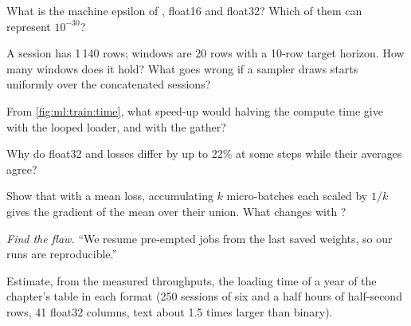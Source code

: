 \begin{exercise}[$\star$]\label{exo:ml:training-infrastructure:1}
What is the machine epsilon of , float16 and float32? Which of them can represent $10^{-30}$?
\end{exercise}

\begin{exercise}[$\star$]\label{exo:ml:training-infrastructure:2}
A session has 1\,140 rows; windows are 20 rows with a 10-row target horizon. How many windows does it hold? What goes wrong if a
sampler draws starts uniformly over the concatenated sessions?
\end{exercise}

\begin{exercise}[$\star$]\label{exo:ml:training-infrastructure:3}
From \cref{fig:ml:train:time}, what speed-up would halving the compute time give with the looped loader, and with the gather?
\end{exercise}

\begin{exercise}[$\star\star$]\label{exo:ml:training-infrastructure:4}
Why do float32 and  losses differ by up to 22\% at some steps while their averages agree?
\end{exercise}

\begin{exercise}[$\star\star$]\label{exo:ml:training-infrastructure:5}
Show that with a mean loss, accumulating $k$ micro-batches each scaled by $1/k$ gives the gradient of the mean over their union.
What changes with ?
\end{exercise}

\begin{exercise}[$\star\star$]\label{exo:ml:training-infrastructure:6}
\emph{Find the flaw.} ``We resume pre-empted jobs from the last saved weights, so our runs are reproducible.''
\end{exercise}

\begin{exercise}[$\star\star\star$]\label{exo:ml:training-infrastructure:7}
Estimate, from the measured throughputs, the  loading time of a year of the chapter's table in each format (250
sessions of six and a half hours of half-second rows, 41 float32 columns, text about 1.5 times larger than binary).
\end{exercise}

